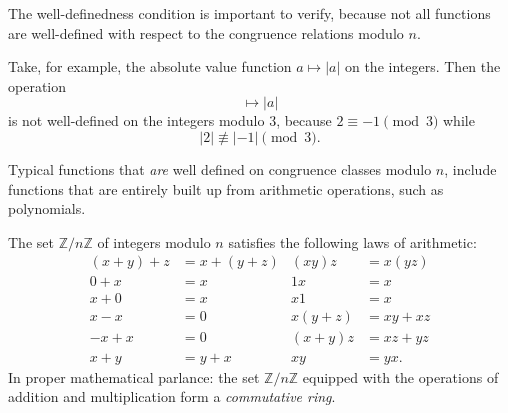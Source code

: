 \begin{example}
  The well-definedness condition is important to verify, because not all functions are well-defined with respect to the congruence relations modulo $n$.

  Take, for example, the absolute value function $a\mapsto |a|$ on the integers. Then the operation
  \begin{equation*}
    [a]\mapsto |a|
  \end{equation*}
  is not well-defined on the integers modulo $3$, because $2\equiv -1\pmod{3}$ while
  \begin{equation*}
    |2|\nequiv |-1|\pmod{3}.
  \end{equation*}

  Typical functions that \emph{are} well defined on congruence classes modulo $n$, include functions that are entirely built up from arithmetic operations, such as polynomials.
\end{example}

\begin{theorem}
  The set $\mathbb{Z}/n\mathbb{Z}$ of integers modulo $n$ satisfies the following laws of arithmetic:
  \begin{align*}
    (x+y)+z & = x + (y+z) & (xy)z & = x(yz) \\
    0+x & = x & 1x & = x \\
    x+0 & = x & x1 & = x \\
    x-x & = 0 & x(y+z) & = xy + xz \\
    -x+x & = 0 & (x+y)z & = xz + yz \\
    x+y & = y+x & xy & = yx.
  \end{align*}
  In proper mathematical parlance: the set $\mathbb{Z}/n\mathbb{Z}$ equipped with the operations of addition and multiplication form a \emph{commutative ring}.
\end{theorem}

